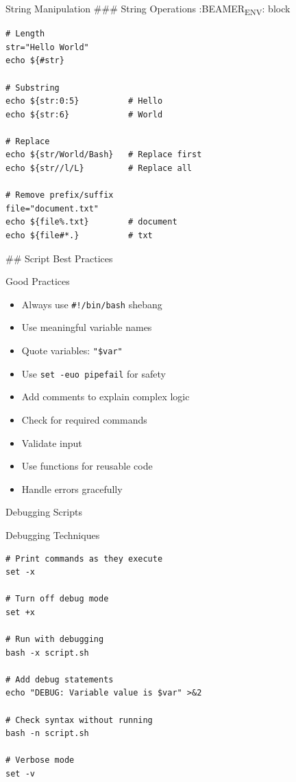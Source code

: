 \documentclass[presentation,aspectratio=1610]{beamer}
\begin{document}
\begin{frame}[label={sec:org60bbd62},fragile]{String Manipulation}
 \#\#\# String Operations
:BEAMER\textsubscript{ENV}: block

\begin{verbatim}
# Length
str="Hello World"
echo ${#str}

# Substring
echo ${str:0:5}          # Hello
echo ${str:6}            # World

# Replace
echo ${str/World/Bash}   # Replace first
echo ${str//l/L}         # Replace all

# Remove prefix/suffix
file="document.txt"
echo ${file%.txt}        # document
echo ${file#*.}          # txt
\end{verbatim}

\#\# Script Best Practices
\begin{block}{Good Practices}
\begin{itemize}[<+->]
\item Always use \texttt{\#!/bin/bash} shebang
\item Use meaningful variable names
\item Quote variables: \texttt{"\$var"}
\item Use \texttt{set -euo pipefail} for safety
\item Add comments to explain complex logic
\item Check for required commands
\item Validate input
\item Use functions for reusable code
\item Handle errors gracefully
\end{itemize}
\end{block}
\end{frame}
\begin{frame}[label={sec:org5f8d7c6},fragile]{Debugging Scripts}
 \begin{block}{Debugging Techniques}
\begin{verbatim}
# Print commands as they execute
set -x

# Turn off debug mode
set +x

# Run with debugging
bash -x script.sh

# Add debug statements
echo "DEBUG: Variable value is $var" >&2

# Check syntax without running
bash -n script.sh

# Verbose mode
set -v
\end{verbatim}
\end{block}
\end{frame}
\end{document}
